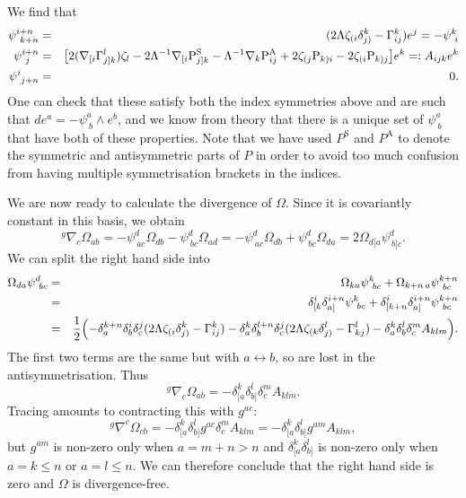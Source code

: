 We find that 
\begin{eqnarray*}
\psi_{\ k+n}^{i+n} & = & (2\Lambda \zeta_{(i}\delta_{j)}^{k}-\Gamma_{ij}^{k})e^{j}=-\psi_{\ i}^{k}\\
\psi_{\ j}^{i+n} & = & \bigl[2({\nabla}_{[i}\Gamma_{j]k}^{l})\zeta_{l}-2\Lambda^{-1}{\nabla}_{[i}\mathrm{P}_{j]k}^{\mathrm{S}}-\Lambda^{-1}{\nabla}_{k}\mathrm{P}_{ij}^{\mathrm{A}}+2\zeta_{(j}\mathrm{P}_{k)i}-2\zeta_{(i}\mathrm{P}_{k)j}\bigr]e^{k}=:A_{ijk}e^{k}\\
\psi_{\ j+n}^{i} & = & 0.
\end{eqnarray*}
One can check that these satisfy both the index symmetries above and
are such that $ de^{a}=-\psi_{\ b}^{a}\wedge e^{b}$, and
we know from theory that there is a unique set of $\psi_{\ b}^{a}$
that have both of these properties. Note that we have used $P^{\mathrm{S}}$
and $P^{\mathrm{A}}$ to denote the symmetric and antisymmetric parts
of $P$ in order to avoid too much confusion from having multiple
symmetrisation brackets in the indices.

We are now ready to calculate the divergence of $\Omega$. Since it
is covariantly constant in this basis, we obtain
\[
{^g\nabla}_{c}\Omega_{ab}=-\psi_{\ ac}^{d}\Omega_{db}-\psi_{\ bc}^{d}\Omega_{ad}=-\psi_{\ ac}^{d}\Omega_{db}+\psi_{\ bc}^{d}\Omega_{da}=2\Omega_{d[a}\psi_{\ b]c}^{d}.
\]
We can split the right hand side into
\begin{eqnarray*}
\Omega_{da}\psi_{\ bc}^{d} & = & \Omega_{ka}\psi_{\ bc}^{k}+\Omega_{k+n\, a}\psi_{\ bc}^{k+n}\\
 & = & \delta_{[k}^{i}\delta_{a]}^{i+n}\psi_{\ bc}^{k}+\delta_{[k+n}^{i}\delta_{a]}^{i+n}\psi_{\ bc}^{k+n}\\
 & = & \frac{1}{2}\Bigl(-\delta_{a}^{k+n}\delta_{b}^{i}\delta_{c}^{j}(2\Lambda \zeta_{(i}\delta_{j)}^{k}-\Gamma_{ij}^{k})-\delta_{a}^{k}\delta_{b}^{l+n}\delta_{c}^{j}(2\Lambda \zeta_{(k}\delta_{j)}^{l}-\Gamma_{kj}^{l})-\delta_{a}^{k}\delta_{b}^{l}\delta_{c}^{m}A_{klm}\Bigr).\\
\end{eqnarray*}
The first two terms are the same but with $a\leftrightarrow b$, so
are lost in the antisymmetrisation. Thus
\[
{^g\nabla}_{c}\Omega_{ab}=-\delta_{[a}^{k}\delta_{b]}^{l}\delta_{c}^{m}A_{klm}.
\]
Tracing amounts to contracting this with $g^{ac}$:
\[
{^g\nabla}^{c}\Omega_{cb}=-\delta_{[a}^{k}\delta_{b]}^{l}g^{ac}\delta_{c}^{m}A_{klm}=-\delta_{[a}^{k}\delta_{b]}^{l}g^{am}A_{klm},
\]
but $g^{am}$ is non-zero only when $a=m+n>n$ and $\delta_{[a}^{k}\delta_{b]}^{l}$
is non-zero only when $a=k\leq n$ or $a=l\leq n$. We can therefore
conclude that the right hand side is zero and $\Omega$ is divergence-free.
\koniec

